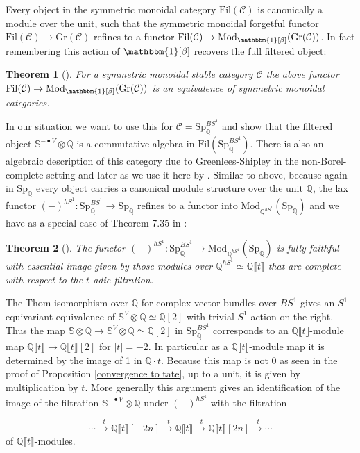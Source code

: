\documentclass[10pt, reqno]{amsart}
\newtheorem{theorem}{Theorem}[section]
\theoremstyle{definition}
\theoremstyle{remark}
\newcommand{\Q}{\mathbb{Q}}
\newcommand{\Sp}{\mathrm{Sp}}
\newcommand{\C}{\mathcal{C}}
\newcommand{\Fil}{\mathrm{Fil}}
\renewcommand{\S}{\mathbb{S}}
\newcommand{\llrrbra}[1]{\llbracket #1\rrbracket}
\newcommand{\Gr}{\mathrm{Gr}}
\newcommand{\unit}{\mathbf{1}}
\newcommand{\Mod}{\mathrm{Mod}}
\renewcommand{\unit}{\mathbbm{1}}
\begin{document}
Every object in the symmetric monoidal category $\Fil(\C)$ is canonically a module over the unit, such that the symmetric monoidal forgetful functor $\Fil(\C)\to\Gr(\C)$ refines to a functor $\Fil(\C)\to \Mod_{\unit[\beta]}(\Gr(\C))$. In fact remembering this action of $\unit[\beta]$ recovers the full filtered object:

\begin{theorem}[\cite{Rak20}]\label{cite1}
	For a symmetric monoidal stable category $\C$ the above functor $\Fil(\C)\to \Mod_{\unit[\beta]}(\Gr(\C))$ is an equivalence of symmetric monoidal categories.
\end{theorem}

In our situation we want to use this for $\C=\Sp_\Q^{BS^1}$ and show that the filtered object $\S^{-\bullet V}\otimes \Q$ is a commutative algebra in $\Fil(\Sp_\Q^{BS^1})$. 
There is also an algebraic description of this category due to Greenlees-Shipley \cite{GS09} in the non-Borel-complete setting and later as we use it here by \cite{MNN17}. Similar to above, because again in $\Sp_\Q$ every object carries a canonical module structure over the unit $\Q$, the lax functor $(-)^{hS^1}:\Sp_\Q^{BS^1}\to\Sp_\Q$ refines to a functor into $\Mod_{\Q^{hS^1}}(\Sp_\Q)$ and we have as a special case of Theorem 7.35 in \cite{MNN17}:

\begin{theorem}[\cite{MNN17}]\label{cite2}
	The functor $(-)^{hS^1}\colon\Sp_\Q^{BS^1}\to\Mod_{\Q^{hS^1}}(\Sp_\Q)$ is fully faithful with essential image given by those modules over $\Q^{hS^1}\simeq \Q\llrrbra t$ that are complete with respect to the $t$-adic filtration.
\end{theorem}

The Thom isomorphism over $\Q$ for complex vector bundles over $BS^1$ gives an $S^1$-equivariant equivalence of $\S^V\otimes \Q\simeq \Q[2]$ with trivial $S^1$-action on the right. Thus the map $\S\otimes \Q\to \S^V\otimes \Q\simeq \Q[2]$ in $\Sp_\Q^{BS^1}$ corresponds to an $\Q\llrrbra t$-module map $\Q\llrrbra t\to \Q\llrrbra t[2]$
for $|t|=-2$. In particular as a $\Q\llrrbra t$-module map it is determined by the image of 1 in $\Q\cdot t$. Because this map is not 0 as seen in the proof of Proposition \ref{convergence to tate}, up to a unit, it is given by multiplication by $t$. More generally this argument gives an identification of the image of the filtration $\S^{-\bullet V}\otimes \Q$ under $(-)^{hS^1}$ with the filtration

\[\cdots\xrightarrow{\cdot t} \Q\llrrbra t[-2n]\xrightarrow{\cdot t}\Q\llrrbra t\xrightarrow{\cdot t}\Q\llrrbra t[2n]\xrightarrow{\cdot t}\cdots\]
of $\Q\llrrbra t$-modules.
\end{document}
